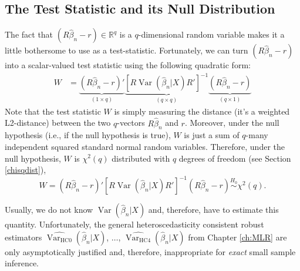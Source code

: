 \documentclass[
  14pt,
]{memoir}
\DeclareMathOperator{\V}{\operatorname{Var}}
\begin{document}
\hypertarget{the-test-statistic-and-its-null-distribution}{%
\subsection{The Test Statistic and its Null Distribution}\label{the-test-statistic-and-its-null-distribution}}

The fact that \((R\hat\beta_n-r)\in\mathbb{R}^q\) is a \(q\)-dimensional random variable makes it a little bothersome to use as a test-statistic. Fortunately, we can turn \((R\hat\beta_n-r)\) into a scalar-valued test statistic using the following quadratic form:
\begin{align*}
W&=\underbrace{(R\hat\beta_n -r)'}_{(1\times q)}\underbrace{[R\V(\hat\beta_n|X)R']^{-1}}_{(q\times q)}\underbrace{(R\hat\beta_n -r)}_{(q\times 1)}
\end{align*}
Note that the test statistic \(W\) is simply measuring the distance (it's a weighted L2-distance) between the two \(q\)-vectors \(R\hat\beta_n\) and \(r\). Moreover, under the null hypothesis (i.e., if the null hypothesis is true), \(W\) is just a sum of \(q\)-many independent squared standard normal random variables. Therefore, under the null hypothesis, \(W\) is \(\chi^2(q)\) distributed with \(q\) degrees of freedom (see Section \ref{chisqdist}),
\begin{equation*}
W=(R\hat\beta_n -r)'[R\V(\hat\beta_n|X)R']^{-1}(R\hat\beta_n-r)\overset{H_0}{\sim} \chi^2(q).
\end{equation*}

Usually, we do not know \(\V(\hat\beta_n|X)\) and, therefore, have to estimate this quantity. Unfortunately, the general heteroscedasticity consistent robust estimators \(\widehat{\V_{\text{HC0}}}(\hat\beta_n|X)\), \(\dots\), \(\widehat{\V_{\text{HC4}}}(\hat\beta_n|X)\) from Chapter \ref{ch:MLR} are only asymptotically justified and, therefore, inappropriate for \emph{exact} small sample inference.
\end{document}
